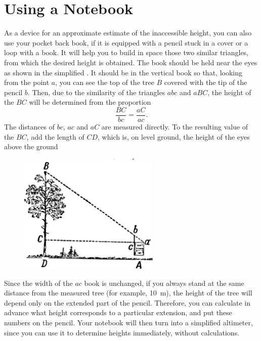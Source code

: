 \section{Using a Notebook}
\label{sec-1.5}

As a device for an approximate estimate of the inaccessible height, you can also use your pocket back book, if it is equipped with a pencil stuck in a cover or a loop with a book. It will help you to build in space those two similar triangles, from which the desired height is obtained. The book should be held near the eyes as shown in the simplified . It should be in the vertical book so that, looking from the point $a$, you can see the top of the tree $B$ covered with the tip of the pencil $b$. Then, due to the similarity of the triangles $abc$ and $aBC$, the height of the $BC$ will be determined from the proportion
\begin{equation*}%
\frac{BC}{bc} = \frac{aC}{ac}.
\end{equation*}
The distances of $bc$, $ac$ and $aC$ are measured directly. To the resulting value of the $BC$, add the length of $CD$, which is, on level ground, the height of the eyes above the ground


\begin{figure}[h!]
\centering
\includegraphics[width=0.6\textwidth]{figures/ch-01/fig-01-09.pdf}
\end{figure}

Since the width of the $ac$ book is unchanged, if you always stand at the same distance from the measured tree (for example, \SI{10}{\meter}), the height of the tree will depend only on the extended part of the pencil. Therefore, you can calculate in advance what height corresponds to a particular extension, and put these numbers on the pencil. Your notebook will then turn into a simplified altimeter, since you can use it to determine heights immediately, without calculations.





